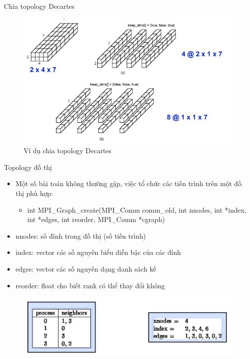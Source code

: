 \documentclass[10pt]{beamer}
\theoremstyle{remark}
\numberwithin{algocf}{section}
\numberwithin{equation}{section}
\numberwithin{dl}{section}
\numberwithin{figure}{section}
\begin{document}
\begin{frame}{Chia topology Decartes}
    \begin{figure}[H]
        \centering
        \includegraphics[height=0.6\textheight]{figures/MPI/Cartesion_sub.png}
        \caption{Ví dụ chia topology Decartes}
    \end{figure}
\end{frame}

\begin{frame}{Topology đồ thị}
    \begin{itemize}
        \item Một số bài toán không thường gặp, việc tổ chức các tiến trình trên một đồ thị phù hợp:
        \begin{itemize}
            \item int MPI\_Graph\_create(MPI\_Comm comm\_old, int nnodes,
                                         int *index, int *edges,
                                         int reorder, MPI\_Comm *cgraph)           
        \end{itemize}
        \item nnodes: số đỉnh trong đồ thị (số tiến trình)
        \item index: vector các số nguyên biểu diễn bậc của các đỉnh
        \item edges: vector các số nguyên dạng danh sách kề
        \item reorder: float cho biết rank có thể thay đổi không
    \end{itemize}

    \begin{figure}[H]
        \centering
        \includegraphics[height=0.3\textheight]{figures/MPI/Graph_Example.png}
    \end{figure}
\end{frame}
\end{document}
